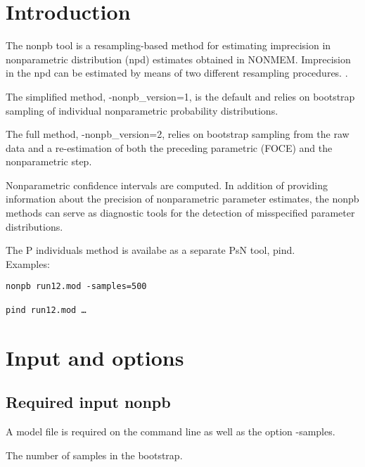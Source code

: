 
\usepackage{hyperref}



\maketitle
\newcommand{\guidetoolname}{nonpb}
\tableofcontents
\newpage

\section{Introduction}

The nonpb tool is a resampling-based method for estimating imprecision in nonparametric distribution (npd) estimates obtained in NONMEM. Imprecision in the npd can be estimated by means of two different resampling procedures. \cite{Baverel}.

The simplified method, -nonpb\_version=1, is the default and relies on bootstrap sampling of individual nonparametric probability distributions. 

The full method, -nonpb\_version=2, relies on bootstrap sampling from the raw data and a re-estimation of both the preceding parametric (FOCE) and the nonparametric step.

Nonparametric confidence intervals are computed. In addition of providing information about the precision of nonparametric parameter estimates, the nonpb methods can serve as diagnostic tools for the detection of misspecified parameter distributions.

The P individuals method is availabe as a separate PsN tool, pind.\\
Examples:
\begin{verbatim}
nonpb run12.mod -samples=500

pind run12.mod …
\end{verbatim}

\section{Input and options}
\subsection{Required input nonpb}
A model file is required on the command line as well as the option -samples.
\begin{optionlist}
The number of samples in the bootstrap. 
\nextopt
\end{optionlist}
